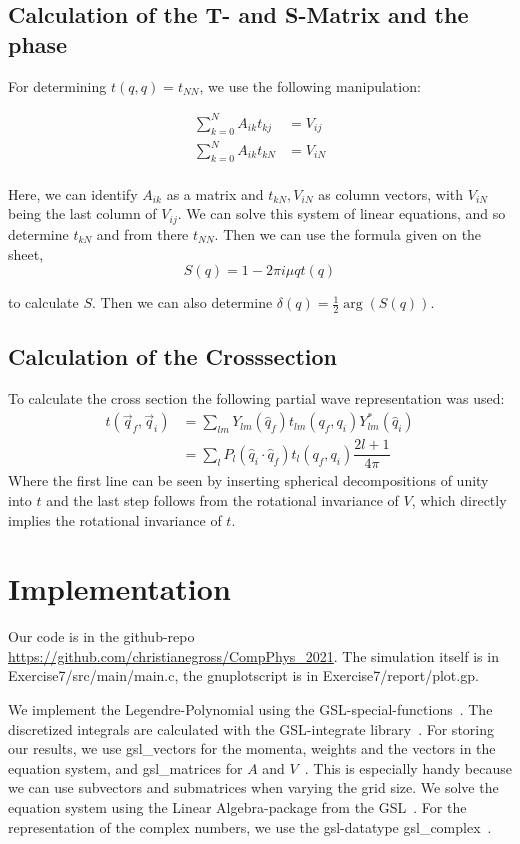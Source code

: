 \documentclass{scrartcl}
\begin{document}
\subsection{Calculation of the T- and S-Matrix and the phase}
	
	For determining $t(q, q)=t_{NN}$, we use the following manipulation:

\begin{align*}
\sum_{k=0}^{N}A_{ik}t_{kj}&=V_{ij}\\
\sum_{k=0}^{N}A_{ik}t_{kN}&=V_{iN}\\
\end{align*}

Here, we can identify $A_{ik}$ as a matrix and $t_{kN}, V_{iN}$ as column vectors, with $V_{iN}$ being the last column of $V_{ij}$. We can solve this system of linear equations, and so determine $t_{kN}$ and from there $t_{NN}$. Then we can use the formula given on the sheet,\[
S(q)=1-2\pi i \mu q t(q)
\]

to calculate $S$. Then we can also determine $\delta(q)=\frac{1}{2}\arg(S(q))$.
	
\subsection{Calculation of the Crosssection}
To calculate the cross section the following partial wave representation was used: 
\begin{align*}
	t(\vec{q}_f,\vec{q}_i)&=\sum\limits_{lm} Y_{lm}(\hat{q}_f)t_{lm}(q_f,q_i)Y_{lm}^*(\hat{q}_i)\\
	&=\sum\limits_{l} P_{l}(\hat{q}_i\cdot\hat{q}_f)t_{l}(q_f,q_i)\dfrac{2l+1}{4\pi}
\end{align*}
Where the first line can be seen by inserting spherical decompositions of unity into $t$ and the last step follows from the rotational invariance of $V$, which directly implies the rotational invariance of $t$.
\section{Implementation}

Our code is in the github-repo \url{https://github.com/christianegross/CompPhys\_2021}. The simulation itself is in Exercise7/src/main/main.c, the gnuplotscript is in Exercise7/report/plot.gp. 

We implement the Legendre-Polynomial using the GSL-special-functions~\cite{gsldoc_sf}. The discretized integrals are calculated with the GSL-integrate library~\cite{gsldoc_integrate}. For storing our results, we use gsl\_vectors for the momenta, weights and the vectors in the equation system, and gsl\_matrices for $A$ and $V$~\cite{gsldoc_mat}. This is especially handy because we can use subvectors and submatrices when varying the grid size. We solve the equation system using the Linear Algebra-package from the GSL~\cite{gsldoc_linalg}. For the representation of the complex numbers, we use the gsl-datatype gsl\_complex~\cite{gsldoc_complex}.
\end{document}
